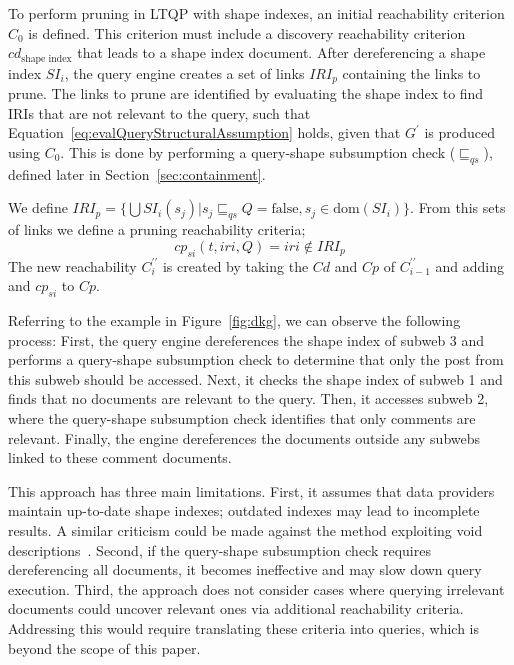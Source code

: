To perform pruning in LTQP with shape indexes, an initial reachability criterion $C_0$ is defined.
This criterion must include a discovery reachability criterion $cd_{\text{shape index}}$ that leads to a shape index document.  
After dereferencing a shape index $SI_i$, the query engine creates a set of links $IRI_p$ containing the links to prune.  
The links to prune are identified by evaluating the shape index to find IRIs that are not relevant to the query, such that Equation~\ref{eq:evalQueryStructuralAssumption} holds, given that $G^{\prime}$ is produced using $C_0$.  
This is done by performing a query-shape subsumption check ($\sqsubseteq_{qs}$), defined later in Section~\ref{sec:containment}.

We define
$IRI_p = \{ \bigcup SI_i(s_j) | s_j \sqsubseteq_{qs}  Q = \mathrm{false}, s_j \in \text{dom}(SI_i) \}$.
From this sets of links we define a pruning reachability criteria;
\begin{equation}
       cp_{si}(t, iri, Q) = iri \notin IRI_p
\end{equation}
The new reachability $C^{\prime\prime}_i$ is created by taking the $Cd$ and $Cp$ of $C^{\prime\prime}_{i-1}$ and adding
and $cp_{si}$ to $Cp$.

Referring to the example in Figure~\ref{fig:dkg}, we can observe the following process:
First, the query engine dereferences the shape index of subweb 3 and performs a query-shape subsumption  check to determine that only the post from this subweb should be accessed.
Next, it checks the shape index of subweb 1 and finds that no documents are relevant to the query.
Then, it accesses subweb 2, where the query-shape subsumption  check identifies that only comments are relevant.
Finally, the engine dereferences the documents outside any subwebs linked to these comment documents.

This approach has three main limitations.  
First, it assumes that data providers maintain up-to-date shape indexes; outdated indexes may lead to incomplete results.
A similar criticism could be made against the method exploiting void descriptions~\cite{Montoya2017}.
Second, if the query-shape subsumption check requires dereferencing all documents, it becomes ineffective and may slow down query execution.  
Third, the approach does not consider cases where querying irrelevant documents could uncover relevant ones via additional reachability criteria.  
Addressing this would require translating these criteria into queries, which is beyond the scope of this paper.

